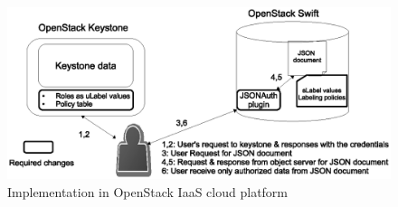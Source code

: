  
 	\begin{figure} [t]
 		\centering
 		\includegraphics[width=.9\textwidth]{NSS16/implementation-in-swift}
 		\caption{Implementation in OpenStack IaaS cloud platform}
 		\label{fig:implementation-in-swift}
 	\end{figure}
 
